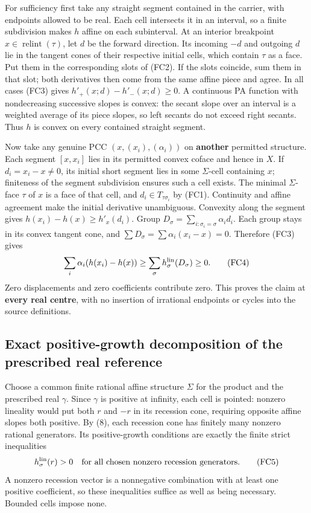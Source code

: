 \documentclass[
  11pt,
]{article}
\begin{document}
For sufficiency first take any straight segment contained in the
carrier, with endpoints allowed to be real. Each cell intersects it in
an interval, so a finite subdivision makes \(h\) affine on each
subinterval. At an interior breakpoint
\(x\in\operatorname{relint}(\tau)\), let \(d\) be the forward direction.
Its incoming \(-d\) and outgoing \(d\) lie in the tangent cones of their
respective initial cells, which contain \(\tau\) as a face. Put them in
the corresponding slots of (FC2). If the slots coincide, sum them in
that slot; both derivatives then come from the same affine piece and
agree. In all cases (FC3) gives \(h'_+(x;d)-h'_-(x;d)\geq0\). A
continuous PA function with nondecreasing successive slopes is convex:
the secant slope over an interval is a weighted average of its piece
slopes, so left secants do not exceed right secants. Thus \(h\) is
convex on every contained straight segment.

Now take any genuine PCC \((x,(x_i),(\alpha_i))\) on \textbf{another}
permitted structure. Each segment \([x,x_i]\) lies in its permitted
convex coface and hence in \(X\). If \(d_i=x_i-x\ne0\), its initial
short segment lies in some \(\Sigma\)-cell containing \(x\); finiteness
of the segment subdivision ensures such a cell exists. The minimal
\(\Sigma\)-face \(\tau\) of \(x\) is a face of that cell, and
\(d_i\in T_{\tau\sigma_i}\) by (FC1). Continuity and affine agreement
make the initial derivative unambiguous. Convexity along the segment
gives \(h(x_i)-h(x)\geq h'_{x}(d_i)\). Group
\(D_\sigma=\sum_{i:\sigma_i=\sigma}\alpha_i d_i\). Each group stays in
its convex tangent cone, and \(\sum D_\sigma=\sum\alpha_i(x_i-x)=0\).
Therefore (FC3) gives \[
 \sum_i\alpha_i(h(x_i)-h(x))\geq
 \sum_\sigma h_\sigma^{\rm lin}(D_\sigma)\geq0.              \tag{FC4}
\] Zero displacements and zero coefficients contribute zero. This proves
the claim at \textbf{every real centre}, with no insertion of irrational
endpoints or cycles into the source definitions.

\subsection{Exact positive-growth decomposition of the prescribed real
reference}\label{exact-positive-growth-decomposition-of-the-prescribed-real-reference}

Choose a common finite rational affine structure \(\Sigma\) for the
product and the prescribed real \(\gamma\). Since \(\gamma\) is positive
at infinity, each cell is pointed: nonzero lineality would put both
\(r\) and \(-r\) in its recession cone, requiring opposite affine slopes
both positive. By (8), each recession cone has finitely many nonzero
rational generators. Its positive-growth conditions are exactly the
finite strict inequalities \[
       h_\sigma^{\rm lin}(r)>0\quad
       \text{for all chosen nonzero recession generators}.     \tag{FC5}
\] A nonzero recession vector is a nonnegative combination with at least
one positive coefficient, so these inequalities suffice as well as being
necessary. Bounded cells impose none.
\end{document}
